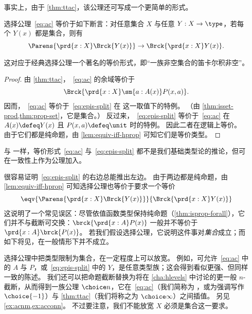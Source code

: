 事实上，由于 \cref{thm:ttac}，该公理还可写成一个更简单的形式。

\begin{lem}\label{thm:ac-epis-split}
  选择公理~\eqref{eq:ac} 等价于如下断言：对任意集合 $X$ 与任意 $Y:X\to\type$，若每个 $Y(x)$ 都是集合，则有
  \begin{equation}
    \Parens{\prd{x:X} \Brck{Y(x)}}
    \to
    \Brck{\prd{x:X} Y(x)}.\label{eq:epis-split}
  \end{equation}
\end{lem}

这对应于经典选择公理一个著名的等价形式，即“一族非空集合的笛卡尔积非空”。

\begin{proof}
  由 \cref{thm:ttac}，~\eqref{eq:ac} 的余域等价于
  \[\Brck{\prd{x:X} \sm{a:A(x)} P(x,a)}.\]
  因而，~\eqref{eq:ac} 等价于~\eqref{eq:epis-split} 在 
  这一取值下的特例。
  （由 \cref{thm:isset-prod,thm:prop-set}，它是集合。）
  反过来，~\eqref{eq:epis-split} 等价于~\eqref{eq:ac} 在 $A(x)\defeq Y(x)$ 且 $P(x,a)\defeq\unit$ 时的特例。
  因此二者在逻辑上等价。
  由于它们都是纯命题，由 \cref{lem:equiv-iff-hprop} 可知它们是等价类型。
\end{proof}

与 \LEM{} 一样，等价形式~\eqref{eq:ac} 与~\eqref{eq:epis-split} 都不是我们基础类型论的推论，但可在一致性上作为公理加入。

\begin{rmk}
  很容易证明~\eqref{eq:epis-split} 的右边总能推出左边。
  由于两边都是纯命题，由 \cref{lem:equiv-iff-hprop} 可知选择公理也等价于要求一个等价
  \[ \eqv{\Parens{\prd{x:X} \Brck{Y(x)}}}{\Brck{\prd{x:X} Y(x)}} \]
  这说明了一个常见误区：尽管依值函数类型保持纯命题（\cref{thm:isprop-forall}），它们并不与截断可交换：$\brck{\prd{x:A} P(x)}$ 一般并不等价于 $\prd{x:A} \brck{P(x)}$。
  若我们假设选择公理，它说明这件事对\emph{集合}成立；而如下将见，在一般情形下并不成立。
\end{rmk}

选择公理中把类型限制为集合，在一定程度上可以放宽。
例如，可允许~\eqref{eq:ac} 中的 $A$ 与 $P$，或~\eqref{eq:epis-split} 中的 $Y$，是任意类型族；这会得到看似更强、但同样一致的陈述。
我们还可以把命题截断替换为将在 \cref{cha:hlevels} 中讨论的更一般 $n$-截断，从而得到一族公理 $\choice n$，它在~\eqref{eq:ac}（我们简称为 \choice{}，或为强调写作 $\choice{-1}$）与 \cref{thm:ttac}（我们将称之为 $\choice\infty$）之间插值。
另见 \cref{ex:acnm,ex:acconn}。
不过要注意，我们不能放宽 $X$ 必须是集合这一要求。

